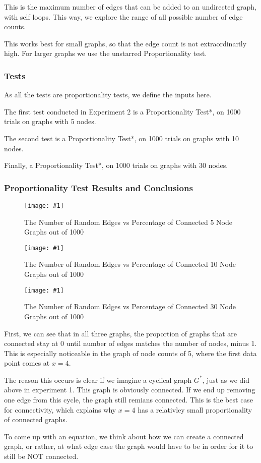 \documentclass[12pt]{article}
\newcommand{\firgureBuffered}[2]
{
    \begin{figure}[ht!]
        \centering
        \texttt{[image: \#1]}
        \caption{#2}
    \end{figure}
}
\begin{document}
This is the maximum number of edges that can be added to an undirected graph, with self loops. This way, we explore the range of all possible number of edge counts.

This works best for small graphs, so that the edge count is not extraordinarily high. For larger graphs we use the unstarred Proportionality test.


\subsubsection{Tests}

As all the tests are proportionality tests, we define the inputs here.

The first test conducted in Experiment 2 is a Proportionality Test*, on 1000 trials on graphs with 5 nodes.

The second test is a Proportionality Test*, on 1000 trials on graphs with 10 nodes.

Finally, a Proportionality Test*, on 1000 trials on graphs with 30 nodes.

\subsubsection{Proportionality Test Results and Conclusions}

\FloatBarrier{}
\firgureBuffered{images/experiment2/a.png}{The Number of Random Edges vs Percentage of Connected 5 Node Graphs out of 1000}
\firgureBuffered{images/experiment2/b.png}{The Number of Random Edges vs Percentage of Connected 10 Node Graphs out of 1000}
\firgureBuffered{images/experiment2/c.png}{The Number of Random Edges vs Percentage of Connected 30 Node Graphs out of 1000}
\FloatBarrier{}

First, we can see that in all three graphs, the proportion of graphs that are connected stay at 0 until number of edges matches the number of nodes, minus 1.
This is especially noticeable in the graph of node counts of 5, where the first data point comes at $x=4$.

The reason this occurs is clear if we imagine a cyclical graph $G^{*}$, just as we did above in experiment 1. This graph is obviously connected. If we end up removing one edge from this cycle, the graph still remians connected.
This is the best case for connectivity, which explains why $x=4$ has a relativley small proportionality of connected graphs.


To come up with an equation, we think about how we can create a connected graph, or rather, at what edge case the graph would have to be in order for it to still be NOT connected.
\end{document}
